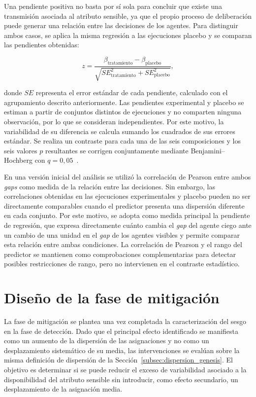 Una pendiente positiva no basta por sí sola para concluir que existe una transmisión asociada al atributo sensible, ya que el propio proceso de deliberación puede generar una relación entre las decisiones de los agentes. Para distinguir ambos casos, se aplica la misma regresión a las ejecuciones placebo y se comparan las pendientes obtenidas:

\begin{equation}
	z =
	\frac{
		\beta_{\mathrm{tratamiento}}
		-
		\beta_{\mathrm{placebo}}
	}{
		\sqrt{
			SE^2_{\mathrm{tratamiento}}
			+
			SE^2_{\mathrm{placebo}}
		}
	},
	\label{eq:transmission_z}
\end{equation}

donde $SE$ representa el error estándar de cada pendiente, calculado con el agrupamiento descrito anteriormente. Las pendientes experimental y placebo se estiman a partir de conjuntos distintos de ejecuciones y no comparten ninguna observación, por lo que se consideran independientes. Por este motivo, la variabilidad de su diferencia se calcula sumando los cuadrados de sus errores estándar. Se realiza un contraste para cada una de las seis composiciones y los seis valores $p$ resultantes se corrigen conjuntamente mediante Benjamini--Hochberg con $q=0{,}05$~\cite{benjamini1995controlling}.

En una versión inicial del análisis se utilizó la correlación de Pearson entre ambos \textit{gaps} como medida de la relación entre las decisiones. Sin embargo, las correlaciones obtenidas en las ejecuciones experimentales y placebo pueden no ser directamente comparables cuando el predictor presenta una dispersión diferente en cada conjunto. Por este motivo, se adopta como medida principal la pendiente de regresión, que expresa directamente cuánto cambia el \textit{gap} del agente ciego ante un cambio de una unidad en el \textit{gap} de los agentes visibles y permite comparar esta relación entre ambas condiciones. La correlación de Pearson y el rango del predictor se mantienen como comprobaciones complementarias para detectar posibles restricciones de rango, pero no intervienen en el contraste estadístico.



\section{Diseño de la fase de mitigación}
\label{sec:mitigacion}

La fase de mitigación se plantea una vez completada la caracterización del sesgo en la fase de detección. Dado que el principal efecto identificado se manifiesta como un aumento de la dispersión de las asignaciones y no como un desplazamiento sistemático de su media, las intervenciones se evalúan sobre la misma definición de dispersión de la Sección~\ref{subsec:dispersion_genesis}. El objetivo es determinar si se puede reducir el exceso de variabilidad asociado a la disponibilidad del atributo sensible sin introducir, como efecto secundario, un desplazamiento de la asignación media.

